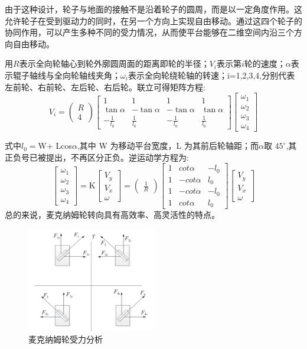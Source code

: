 \documentclass{report}
\begin{document}
由于这种设计，轮子与地面的接触不是沿着轮子的圆周，而是以一定角度作用。这允许轮子在受到驱动力的同时，在另一个方向上实现自由移动。通过这四个轮子的协同作用，可以产生多种不同的受力情况，从而使平台能够在二维空间内沿三个方向自由移动。


用$R$表示全向轮轴心到轮外廓圆周面的距离即轮的半径；$V_i$表示第$i$轮的速度；$\alpha$表示辊子轴线与全向轮轴线夹角；$\omega_i$表示全向轮绕轮轴的转速；i=1,2,3,4,分别代表左前轮、右前轮、左后轮、右后轮。联立可得矩阵方程:
\[ V_i=\begin{pmatrix}R\\4\end{pmatrix}\begin{bmatrix}1&1&1&1\\\tan\alpha&-\tan\alpha&-\tan\alpha&\tan\alpha\\-\frac{1}{l_0}&\frac{1}{l_0}&-\frac{1}{l_0}&\frac{1}{l_0}\end{bmatrix}\begin{bmatrix}\omega_1\\\omega_2\\\omega_3\\\omega_4\end{bmatrix}\]

式中$l_0=$W+ Lcos$\alpha$,其中 W 为移动平台宽度，L 为其前后轮轴距；而$\alpha$取
$45^{\circ}$,其正负号已被提出，不再区分正负。逆运动学方程为:
\[\begin{bmatrix}\omega_1\\\omega_2\\\omega_3\\\omega_4\end{bmatrix}=\text{K}\begin{bmatrix}V_y\\V_x\\\omega\end{bmatrix}=\begin{pmatrix}\frac{1}{R}\end{pmatrix}\begin{bmatrix}1&cot\alpha&-l_0\\1&-cot\alpha&l_0\\1&-cot\alpha&-l_0\\1&cot\alpha&l_0\end{bmatrix}\begin{bmatrix}V_y\\V_x\\\omega\end{bmatrix}\]
总的来说，麦克纳姆轮转向具有高效率、高灵活性的特点。
\begin{figure}[ht]
  \centering
  \includegraphics[width=0.5\textwidth]{figures/mac.png}
  \caption{麦克纳姆轮受力分析 }
\end{figure}
\end{document}
